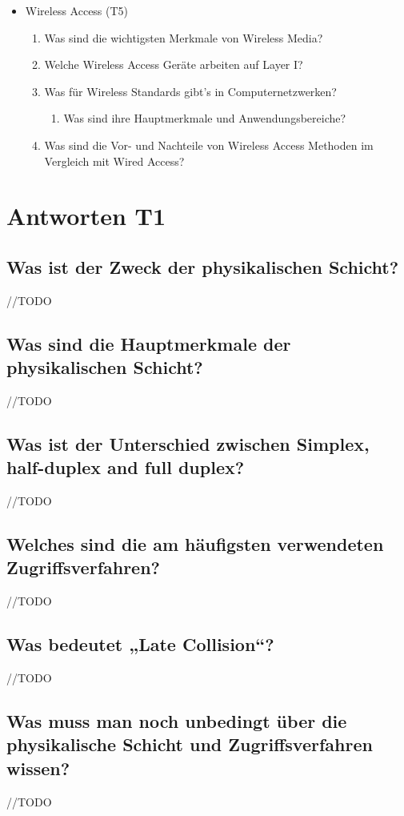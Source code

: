 \begin{itemize}
    \item Wireless Access (T5)
    \begin{enumerate}
        \item Was sind die wichtigsten Merkmale von \flqq{}Wireless Media\frqq?
        \item Welche Wireless Access Geräte arbeiten auf Layer I?
        \item Was für Wireless Standards gibt’s in Computernetzwerken?
        \begin{enumerate}
            \item Was sind ihre Hauptmerkmale und Anwendungsbereiche?
        \end{enumerate}
        \item Was sind die Vor- und Nachteile von \flqq{}Wireless Access\frqq{} Methoden im Vergleich mit \flqq{}Wired Access\frqq?
    \end{enumerate}
\end{itemize}

\section{Antworten T1}
\subsection*{Was ist der Zweck der physikalischen Schicht?}
//TODO
\subsection*{Was sind die Hauptmerkmale der physikalischen Schicht?}
//TODO
\subsection*{Was ist der Unterschied zwischen \flqq{}Simplex\frqq, \flqq{}half-duplex\frqq{} and \flqq{}full duplex\frqq?}
//TODO
\subsection*{Welches sind die am häufigsten verwendeten Zugriffsverfahren?}
//TODO
\subsection*{Was bedeutet „Late Collision“?}
//TODO
\subsection*{Was muss man noch unbedingt über die physikalische Schicht und Zugriffsverfahren wissen?}
//TODO

